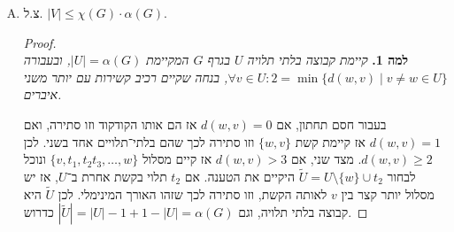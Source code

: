 \documentclass[]{article}
\newcommand\ag    {\alpha}
\newcommand\tl    {\tilde}
\begin{document}
	\begin{enumerate}[(A)]
		\item צ.ל. $|V| \le \chi(G) \cdot \ag(G)$. \begin{proof} \ \\
			\textbf{למה 1. }\textit{קיימת קבוצה בלתי תלויה $U$ בגרף $G$ המקיימת $|U| = \alpha(G)$, ובעבורה $\forall v \in U\colon 2 = \min \{d(w, v) \mid v \neq w \in U\}$, בנחה שקיים רכיב קשירות עם יותר משני איברים. }
			
			בעבור חסם תחתון, אם $d(w, v) = 0$ אז הם אותו הקודקוד וזו סתירה, ואם $d(w, v) = 1$ אז קיימת קשת $\{w, v\}$ וזו סתירה לכך שהם בלתי־תלויים אחד בשני. לכן $d(w, v) \ge 2$. מצד שני, אם $d(w, v) > 3$ אז קיים מסלול $\{v, t_1, t_2 t_3, \dots, w\}$ ונוכל לבחור $\tl U = U \setminus \{w\} \cup t_2$ היקיים את הטענה. אם $t_2$ תלוי בקשת אחרת ב־$U$, אז יש מסלול יותר קצר בין $v$ לאותה הקשת, וזו סתירה לכך שזהו האורך המינימלי. לכן $\tl U$ היא קבוצה בלתי תלויה, וגם $|\tl U| = |U| - 1 + 1 - |U| = \ag(G)$ כדרוש. 
			

\end{proof}
\end{enumerate}
\end{document}
